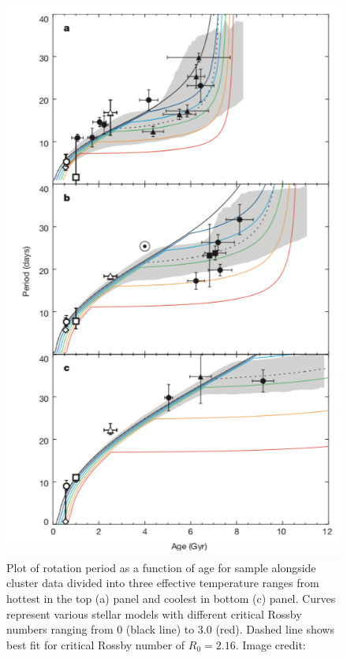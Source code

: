 \begin{figure}[h]
    \centering
    \includegraphics[scale=0.35]{Figures/2-Historical_overview/van_saders_R0_plot.png}
    \caption[Rotation period as a function of age with various stellar models that include a critical Rossby number]{Plot of rotation period as a function of age  for \citet{van_Saders_etal_2016} sample alongside cluster data divided into three effective temperature ranges from hottest in the top (a) panel and coolest in bottom (c) panel. Curves represent various stellar models with different critical Rossby numbers ranging from 0 (black line) to 3.0 (red). Dashed line shows best fit for critical Rossby number of $R_{0} = 2.16$. Image credit: \citet{van_Saders_etal_2016}}
    \label{fig:van_saders_plot_2}
\end{figure}

